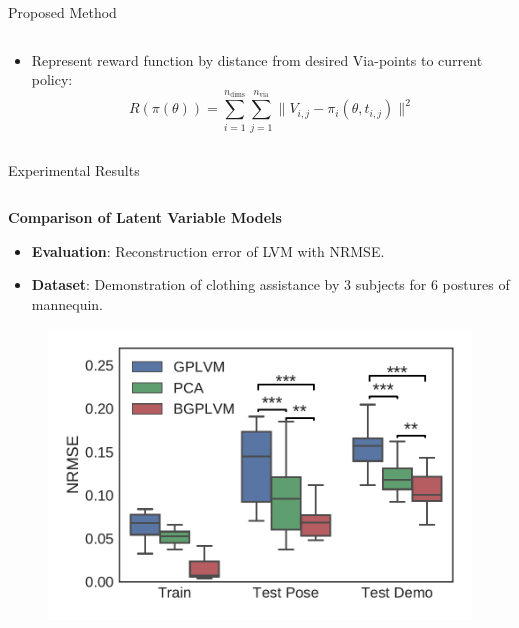 \documentclass[final,hyperref={pdfpagelabels=false}]{beamer}
\begin{document}
\begin{frame}[t]
\begin{columns}[t]
\begin{column}{0.96\linewidth}
\begin{alertblock}{Proposed Method}
\begin{columns}[t]
\begin{column}{0.3\textwidth}
                        \begin{itemize}
                            \item Represent reward function by distance from desired Via-points to current policy:
                            \begin{equation*}
                                R(\pi(\theta)) = \sum_{i=1}^{n_{\text{dims}}} \sum_{j=1}^{n_{\text{via}}} \| V_{i,j} - \pi_i(\theta, t_{i,j}) \|^2
                            \end{equation*}
                        \end{itemize}
                    \end{column}
                \end{columns}
            \end{alertblock}
            \vspace*{2cm}
            \begin{alertblock}{Experimental Results}
                \begin{columns}[t]
                    \begin{column}{0.33\textwidth}
                        \centering \textbf{Comparison of Latent Variable Models}

                        \begin{itemize}
                            \item \textbf{Evaluation}: Reconstruction error of LVM with NRMSE.
                            \item \textbf{Dataset}: Demonstration of clothing assistance by 3 subjects for 6 postures of mannequin.
                        \end{itemize}
                        \vspace*{1cm}
                        \begin{figure}
                            \centering
                            \includegraphics[width=\textwidth]{jaError}
                        \end{figure}
                    \end{column}


\end{columns}
\end{alertblock}
\end{column}
\end{columns}
\end{frame}
\end{document}
